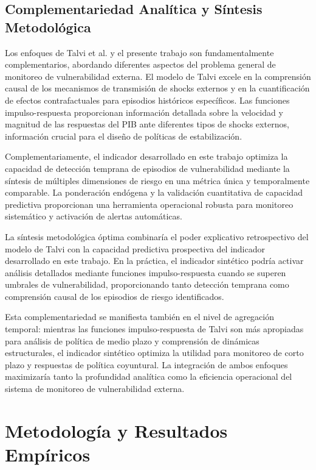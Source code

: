 \documentclass[3p,11pt]{elsarticle}
\begin{document}
\subsection{Complementariedad Analítica y Síntesis Metodológica}

Los enfoques de Talvi et al. y el presente trabajo son fundamentalmente complementarios, abordando diferentes aspectos del problema general de monitoreo de vulnerabilidad externa. El modelo de Talvi excele en la comprensión causal de los mecanismos de transmisión de shocks externos y en la cuantificación de efectos contrafactuales para episodios históricos específicos. Las funciones impulso-respuesta proporcionan información detallada sobre la velocidad y magnitud de las respuestas del PIB ante diferentes tipos de shocks externos, información crucial para el diseño de políticas de estabilización.

Complementariamente, el indicador desarrollado en este trabajo optimiza la capacidad de detección temprana de episodios de vulnerabilidad mediante la síntesis de múltiples dimensiones de riesgo en una métrica única y temporalmente comparable. La ponderación endógena y la validación cuantitativa de capacidad predictiva proporcionan una herramienta operacional robusta para monitoreo sistemático y activación de alertas automáticas.

La síntesis metodológica óptima combinaría el poder explicativo retrospectivo del modelo de Talvi con la capacidad predictiva prospectiva del indicador desarrollado en este trabajo. En la práctica, el indicador sintético podría activar análisis detallados mediante funciones impulso-respuesta cuando se superen umbrales de vulnerabilidad, proporcionando tanto detección temprana como comprensión causal de los episodios de riesgo identificados.

Esta complementariedad se manifiesta también en el nivel de agregación temporal: mientras las funciones impulso-respuesta de Talvi son más apropiadas para análisis de política de medio plazo y comprensión de dinámicas estructurales, el indicador sintético optimiza la utilidad para monitoreo de corto plazo y respuestas de política coyuntural. La integración de ambos enfoques maximizaría tanto la profundidad analítica como la eficiencia operacional del sistema de monitoreo de vulnerabilidad externa.

\section{Metodología y Resultados Empíricos}
\end{document}
